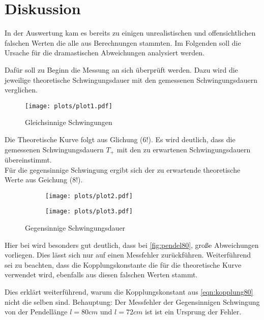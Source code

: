 \section{Diskussion}
\label{sec:Diskussion}

In der Auswertung kam es bereits zu einigen unrealistischen und offensichtlichen
falschen Werten die alle aus Berechnungen stammten.
Im Folgenden soll die Ursache für die dramastischen Abweichungen analysiert werden.


Dafür soll zu Beginn die Messung an sich überprüft werden.
Dazu wird die jeweilige theoretische Schwingungsdauer mit den gemessenen Schwingungsdauern verglichen.
\begin{figure}
    \centering
    \texttt{[image: plots/plot1.pdf]}
    \caption{Gleichsinnige Schwingungen}
\end{figure}
Die Theoretische Kurve folgt aus Glichung (6!). Es wird deutlich, dass die gemessenen
Schwingungsdauern $T_+$ mit den zu erwartenen Schwingungsdauern übereinstimmt.\\

Für die gegensinnige Schwingung ergibt sich der zu erwartende theoretische Werte aus Geichung (8!).

\begin{figure}
    \begin{subfigure}[c]{0.5\textwidth}
        \texttt{[image: plots/plot2.pdf]}
    \end{subfigure}
    \begin{subfigure}[c]{0.5\textwidth}
        \texttt{[image: plots/plot3.pdf]}
        \label{fig:pedel80}
    \end{subfigure}
    \caption{Gegensinnige Schwingungsdauer}
\end{figure}

Hier bei wird besonders gut deutlich, dass bei \ref{fig:pendel80}, große Abweichungen
vorliegen. Dies lässt sich nur auf einen Messfehler zurückführen.
Weiterführend sei zu beachten, dass die Kopplungskonstante die für die theoretische Kurve
verwendet wird, ebenfalls aus diesen falschen Werten stammt.

Dies erklärt weiterführend, warum die Kopplungskonstant aus \ref{eqn:kopplung80} nicht die selben
sind.
Behauptung: Der Messfehler der Gegensinnigen Schwingung von der Pendellänge $l=80cm$ und $l=72cm$ ist 
ist ein Ursprung der Fehler.

